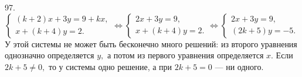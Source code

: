 97. $\begin{cases}
(k+2)x+3y=9+kx,\\
x+(k+4)y=2.
\end{cases}\Leftrightarrow\begin{cases}
2x+3y=9,\\
x+(k+4)y=2.
\end{cases}\Leftrightarrow\begin{cases}
2x+3y=9,\\
(2k+5)y=-5.
\end{cases}$
У этой системы не может быть бесконечно много решений: из второго уравнения однозначно определяется $y,$ а потом из первого уравнения определяется $x.$ Если $2k+5\neq0,$ то у системы одно решение, а при $2k+5=0$ --- ни одного.\\
